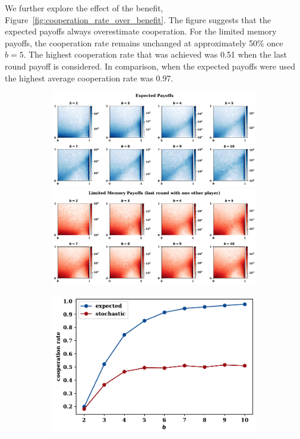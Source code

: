 \documentclass[11pt]{article}
\theoremstyle{plainCl1}
\theoremstyle{plainCl2}
\begin{document}
We further explore the effect of the benefit,
Figure~\ref{fig:cooperation_rate_over_benefit}. The figure suggests that the
expected payoffs always overestimate cooperation. For the limited memory
payoffs, the cooperation rate remains unchanged at approximately 50\% once \(b =
5\). The highest cooperation rate that was achieved was 0.51 when  the last
round payoff is considered. In comparison, when the expected payoffs were used
the highest average cooperation rate was 0.97.

\begin{figure}[!htbp]
  \centering
  \begin{subfigure}{.5\textwidth}
    \centering
    \includegraphics[width=\textwidth]{static/expected_for_beta.pdf}
    \includegraphics[width=\textwidth]{static/stochastic_for_beta.pdf}
  \end{subfigure}%
  \begin{subfigure}{.5\textwidth}
    \centering
    \includegraphics[width=\textwidth]{static/cooperation_rate_over_b.pdf}

\end{subfigure}
\end{figure}
\end{document}
